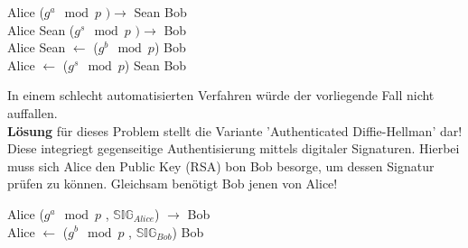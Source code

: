 \documentclass[a4paper,12pt]{scrartcl}
\begin{document}
\begin{center}
 Alice  ($g^a \mod p$ $)  \rightarrow$ \hspace{2cm}  Sean \hspace{4cm} Bob\\
 Alice   \hspace{3.9cm}  Sean ($g^s \mod p$ $) \rightarrow$ \hspace{2.1cm} Bob\\
 Alice   \hspace{3.9cm}  Sean \hspace{2.2cm} $\leftarrow$ ($g^b \mod p$) Bob\\
 Alice   \hspace{2.2cm}$\leftarrow$ ($g^s \mod p$)  Sean \hspace{4.1cm}  Bob\\
 

 
 
\end{center}

In einem schlecht automatisierten Verfahren würde der vorliegende Fall nicht auffallen.\\
\textbf{Lösung} für dieses Problem stellt die Variante 'Authenticated Diffie-Hellman' dar!\\
Diese integriegt gegenseitige Authentisierung mittels digitaler Signaturen. Hierbei muss sich Alice den Public Key (RSA) bon Bob besorge, um dessen Signatur prüfen zu können. Gleichsam benötigt Bob jenen von Alice!
\begin{center}
 Alice ($g^a \mod p$ , $\mathbb{\text{SIG}}_{Alice}$)  \hspace{3cm} $\rightarrow$ \hspace{2cm} Bob\\
 Alice   \hspace{3.4cm} $\leftarrow$ \hspace{2cm}($g^b \mod p$ , $\mathbb{\text{SIG}}_{Bob}$) Bob
\end{center}
\end{document}
